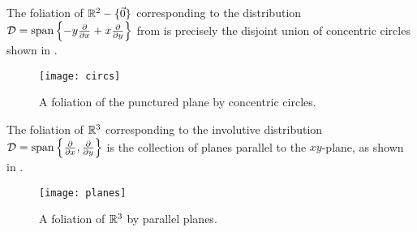 \begin{example}
	The foliation of $\mathbb{R}^2 - \{\vec{0}\}$ corresponding to the distribution $\mathcal{D} = \operatorname{span}\left\{-y \frac{\partial}{\partial x} + x \frac{\partial}{\partial y}\right\}$ from  is precisely the disjoint union of concentric circles shown in .
\end{example}

\begin{figure}[htbp]
	\centering
		\texttt{[image: circs]}
	\caption{A foliation of the punctured plane by concentric circles.}
	\label{fig:circs}
\end{figure}

\begin{example}
	The foliation of $\mathbb{R}^3$ corresponding to the involutive distribution $\mathcal{D} = \operatorname{span} \left\{ \frac{\partial}{\partial x}, \frac{\partial}{\partial y} \right\}$ is the collection of planes parallel to the $xy$-plane, as shown in .
\end{example}

\begin{figure}[htbp]
	\centering
		\texttt{[image: planes]}
	\caption{A foliation of $\mathbb{R}^3$ by parallel planes.}
	\label{fig:planes}
\end{figure}